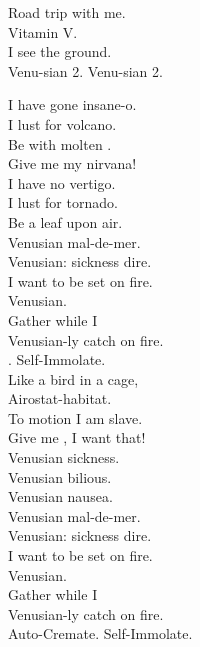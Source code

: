 Road trip with me. \\
Vitamin V. \\
I see the ground. \\

Venu-sian 2. Venu-sian 2. \\





I have gone insane-o. \\
I lust for volcano. \\
Be with molten . \\
Give me my nirvana! \\
I have no vertigo. \\
I lust for tornado. \\
Be a leaf upon air.\\
Venusian mal-de-mer. \\

Venusian: sickness dire. \\
I want to be set on fire. \\
Venusian. \\
Gather while I \\
Venusian-ly catch on fire. \\

. Self-Immolate. \\

Like a bird in a cage, \\
Airostat-habitat. \\
To motion I am slave. \\
Give me , I want that! \\
Venusian sickness. \\
Venusian bilious. \\
Venusian nausea. \\
Venusian mal-de-mer. \\

Venusian: sickness dire. \\
I want to be set on fire. \\
Venusian. \\
Gather while I \\
Venusian-ly catch on fire. \\

Auto-Cremate. Self-Immolate. \\


